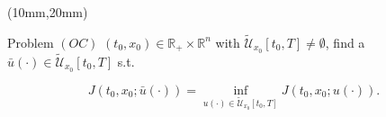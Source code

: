 \begin{frame}
	\begin{textblock*}{110mm}(10mm,20mm)
		\begin{graybox}{Problem $(OC)$}
			$(t_0,x_0)\in \mathbb{R}_{+}\times \mathbb{R}^n$ with $\tilde{\mathcal{U}}_{x_0}[t_0,T]\neq\emptyset$, find a $\bar{u}(\cdot)\in \tilde{\mathcal{U}}_{x_0}[t_0,T]$ s.t.
			
			\begin{equation*}
				J(t_0,x_0;\bar{u}(\cdot))=\inf_{u(\cdot)\in \tilde{\mathcal{U}}_{x_0}[t_0,T]} J(t_0,x_0;u(\cdot)).
			\end{equation*}
		\end{graybox}
	\end{textblock*}
\end{frame}
